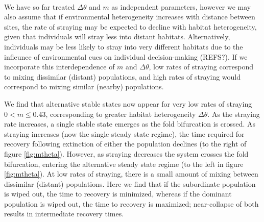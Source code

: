 \documentclass[twocolumn,preprintnumbers,amsmath,amssymb,superscriptaddress]{revtex4}
\begin{document}

\\ 
\noindent We have so far treated $\Delta\theta$ and $m$ as independent parameters, however we may also assume that if environmental heterogeneity increases with distance between sites, the rate of straying may be expected to decline with habitat heterogeneity, given that individuals will stray less into distant habitats. %
Alternatively, individuals may be less likely to stray into very different habitats due to the infleunce of environmental cues on individual decision-making (REFS?).
If we incorporate this interdependence of $m$ and $\Delta\theta$, low rates of straying correspond to mixing dissimilar (distant) populations, and high rates of straying would correspond to mixing similar (nearby) populations.

We find that alternative stable states now appear for very low rates of straying $0 < m \leq 0.43$, corresponding to greater habitat heterogeneity $\Delta\theta$.
As the straying rate increases, a single stable state emerges as the fold bifurcation is crossed.
As straying increases (now the single steady state regime), the time required for recovery following extinction of either the population declines (to the right of figure \ref{fig:mtheta}).
However, as straying decreases the system crosses the fold bifurcation, entering the alternative steady state regime (to the left in figure \ref{fig:mtheta}).
At low rates of straying, there is a small amount of mixing between dissimilar (distant) populations.
Here we find that if the subordinate population is wiped out, the time to recovery is minimized, whereas if the dominant population is wiped out, the time to recovery is maximized; near-collapse of both results in intermediate recovery times.
\end{document}
